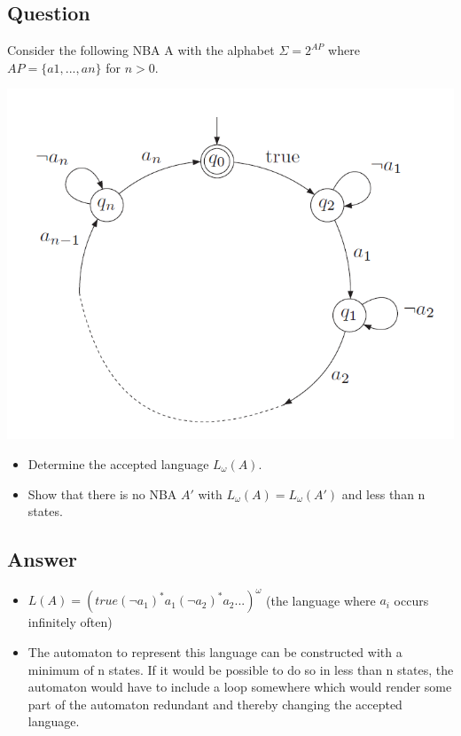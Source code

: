 \documentclass[12pt]{article}
\begin{document}
\subsection*{Question}
Consider the following NBA A with the alphabet $\Sigma = 2^{AP}$ where $AP =
\{ a1, . . . , an \}$ for $n > 0$.\\
\begin{centering}
	\includegraphics*[scale=0.5]{ex417.png}
\end{centering}
\begin{itemize}
	\item Determine the accepted language $L_\omega(A)$.
	\item Show that there is no NBA $A'$ with $L_\omega(A) = L_\omega(A')$ and less than n states.
\end{itemize}
\subsection*{Answer}
\begin{itemize}
	\item $L(A) = (true (\neg a_1)^*a_1(\neg a_2)^*a_2 ...)^\omega$ (the language where $a_i$ occurs infinitely often)
	\item The automaton to represent this language can be constructed with a minimum of n states. If it would be possible to do so in less than n states, the automaton would have to include a loop somewhere which would render some part of the automaton redundant and thereby changing the accepted language.
\end{itemize}
\end{document}
